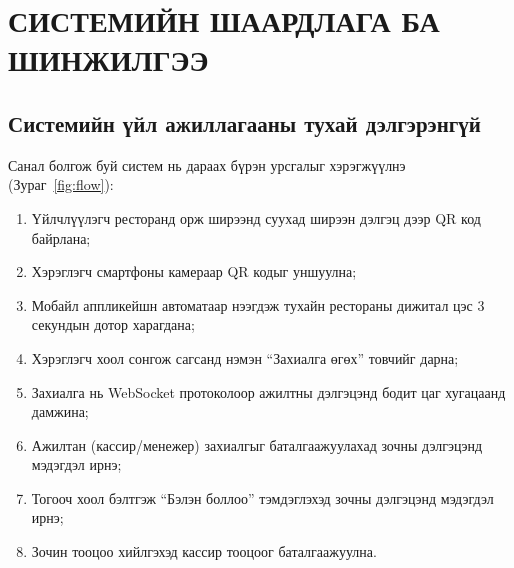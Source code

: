 \chapter{СИСТЕМИЙН ШААРДЛАГА БА ШИНЖИЛГЭЭ}
\label{ch2}

\section{Системийн үйл ажиллагааны тухай дэлгэрэнгүй}

Санал болгож буй систем нь дараах бүрэн урсгалыг хэрэгжүүлнэ (Зураг~\ref{fig:flow}):

\begin{enumerate}[leftmargin=*]
  \item Үйлчлүүлэгч ресторанд орж ширээнд суухад ширээн дэлгэц дээр QR код байрлана;
  \item Хэрэглэгч смартфоны камераар QR кодыг уншуулна;
  \item Мобайл аппликейшн автоматаар нээгдэж тухайн рестораны дижитал цэс 3 секундын
        дотор харагдана;
  \item Хэрэглэгч хоол сонгож сагсанд нэмэн ``Захиалга өгөх'' товчийг дарна;
  \item Захиалга нь WebSocket протоколоор ажилтны дэлгэцэнд бодит цаг хугацаанд дамжина;
  \item Ажилтан (кассир/менежер) захиалгыг баталгаажуулахад зочны дэлгэцэнд мэдэгдэл ирнэ;
  \item Тогооч хоол бэлтгэж ``Бэлэн боллоо'' тэмдэглэхэд зочны дэлгэцэнд мэдэгдэл ирнэ;
  \item Зочин тооцоо хийлгэхэд кассир тооцоог баталгаажуулна.
\end{enumerate}


